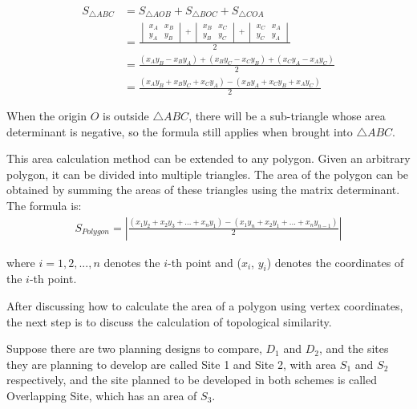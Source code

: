 \begin{equation}
\begin{split}
S_{\triangle ABC}
&=S_{\triangle AOB}+S_{\triangle BOC}+S_{\triangle COA}\\
&=\frac{\begin{vmatrix}
  x_{A} &x_{B}  \\
  y_{A} &y_{B} 
\end{vmatrix}+\begin{vmatrix}
  x_{B}& x_{C}\\
  y_{B}&y_{C}
\end{vmatrix}+\begin{vmatrix}
  x_{C}&x_{A} \\
  y_{C}&y_{A}
\end{vmatrix}}{2}\\
&=\frac{(x_{A}y_{B}-x_{B}y_{A})+(x_{B}y_{C}-x_{C}y_{B}) +(x_{C}y_{A}-x_{A}y_{C})  }{2}\\
&=\frac{(x_{A}y_{B}+x_{B}y_{C}+x_{C}y_{A})-(x_{B}y_{A}+x_{C}y_{B}+x_{A}y_{C})}{2}
\end{split}
\end{equation}

When the origin $O$ is outside $\triangle ABC$, there will be a sub-triangle whose area determinant is negative, so the formula still applies when brought into $\triangle ABC$.

This area calculation method can be extended to any polygon. Given an arbitrary polygon, it can be divided into multiple triangles. The area of the polygon can be obtained by summing the areas of these triangles using the matrix determinant.
The formula is:
\begin{equation}
\begin{split}
S_{Polygon}= \left | \frac{(x_{1}y_{2} +x_{2}y_{3}+...+x_{n}y_{1} )-(x_{1}y_{n} +x_{2}y_{1}+...+x_{n}y_{n-1})}{2}  \right | 
\end{split}
\end{equation}

where $i=1,2,...,n$ denotes the $i$-th point and ($x_{i}$, $y_{i}$) denotes the coordinates of the $i$-th point.

After discussing how to calculate the area of a polygon using vertex coordinates, the next step is to discuss the calculation of topological similarity.

Suppose there are two planning designs to compare, $D_1$ and $D_2$, and the sites they are planning to develop are called Site 1 and Site 2, with area $S_1$ and $S_2$ respectively, and the site planned to be developed in both schemes is called Overlapping Site, which has an area of $S_3$.

